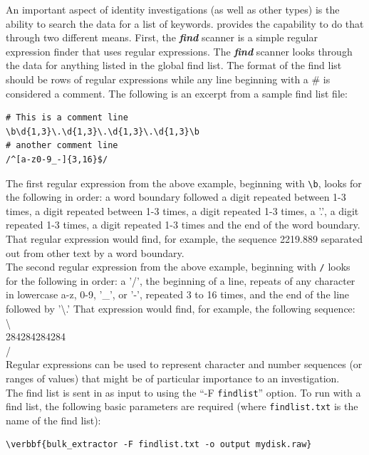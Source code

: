 \documentclass[11pt]{article} %
\begin{document}
An important aspect of identity investigations (as well as other types) is the ability to search the data for a list of keywords. \bulk provides the capability to do that through two different means. First, the  \textbf{\textit{find}} scanner is a simple regular expression finder that uses regular expressions. The \textbf{\textit{find}} scanner looks through the data for anything listed in the global find list. The format of the find list should be rows of regular expressions while any line beginning with a \# is considered a comment. The following is an excerpt from a sample find list file:
\lstset{style=customfile}
\begin{lstlisting}
# This is a comment line
\b\d{1,3}\.\d{1,3}\.\d{1,3}\.\d{1,3}\b
# another comment line
/^[a-z0-9_-]{3,16}$/
\end{lstlisting}
The first regular expression from the above example, beginning with \texttt{\textbackslash b}, looks for the following in order: a word boundary followed a digit repeated between 1-3 times, a digit repeated between 1-3 times, a digit repeated 1-3 times, a '.', a digit repeated 1-3 times, a digit repeated 1-3 times and the end of the word boundary. That regular expression would find, for example, the sequence 2219.889 separated out from other text by a word boundary.\\

The second regular expression from the above example, beginning with \texttt{/} looks for the following in order: a '/', the beginning of a line, repeats of any character in lowercase a-z, 0-9, '\_', or '-', repeated 3 to 16 times, and the end of the line followed by '\textbackslash.' That expression would find, for example, the following sequence:
\\
\textbackslash \\
284284284284 \\
/ \\
Regular expressions can be used to represent character and number sequences (or ranges of values) that might be of particular importance to an investigation. \\

The find list is sent in as input to \bulk using the ``-F \texttt{findlist}'' option. To run \bulk with a find list, the following basic parameters are required (where \texttt{findlist.txt} is the name of the find list):
\begin{Verbatim}[commandchars=\\\{\}]
\verbbf{bulk_extractor -F findlist.txt -o output mydisk.raw}
\end{Verbatim}
\end{document}
